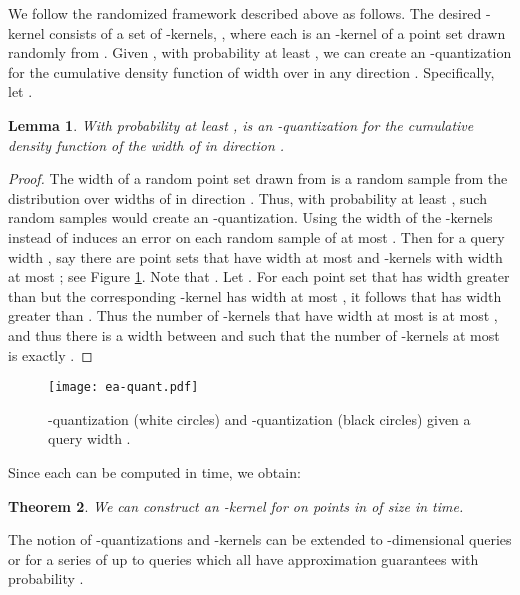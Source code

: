 \documentclass{journal}
\newtheorem {theorem}{Theorem}[section]
\newtheorem {lemma}[theorem]{Lemma}
\begin{document}
We follow the randomized framework described above as follows.
The desired -kernel  consists of a set of  -kernels,  , where each  is an -kernel of a point set  drawn randomly from .  Given , with probability at least , we can create an -quantization for the cumulative density function of width over  in any direction .
Specifically, let .

\begin{lemma}
With probability at least ,
 is an -quantization for the cumulative density function of the width of  in direction .
\end{lemma}
\begin{proof}
The width  of a random point set  drawn from  is a random sample from the distribution over widths of  in direction .  Thus, with probability at least ,  such random samples would create an -quantization.  Using the width of the -kernels  instead of  induces an error on each random sample of at most .
Then for a query width , say there are  point sets  that have width at most  and  -kernels  with width at most ; see Figure \ref{fig:ea-quant}.
Note that .
Let . For each point set  that has width greater than  but the corresponding -kernel  has width at most ,
it follows that  has width greater than .
Thus the number of -kernels  that have width at most  is at most , and thus there is a width  between  and  such that the number of -kernels at most  is exactly .
\end{proof}

\begin{figure}[htb!]
\begin{center}
\texttt{[image: ea-quant.pdf]}
\end{center}
\caption[Error bounds in -quantization]{\label{fig:ea-quant} -quantization  (white circles) and -quantization  (black circles) given a query width .}
\end{figure}



Since each  can be computed in  time, we obtain:


\begin{theorem}
We can construct an -kernel for  on  points in  of size  in  time.
\end{theorem}



The notion of -quantizations and -kernels can be extended to -dimensional queries or for a series of up to  queries which all have approximation guarantees with probability .
\end{document}
